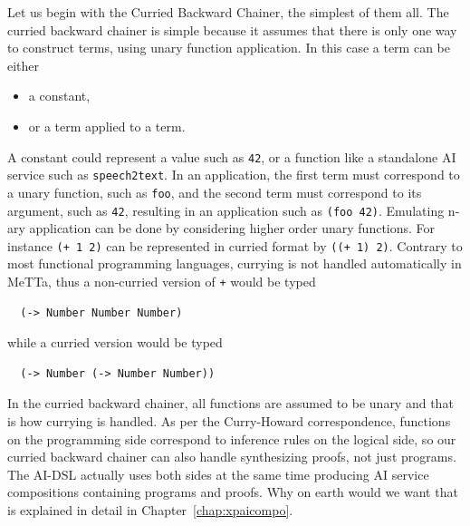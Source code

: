 \documentclass[]{report}
\begin{document}
Let us begin with the Curried Backward Chainer, the simplest of them
all.  The curried backward chainer is simple because it assumes that
there is only one way to construct terms, using unary function
application.  In this case a term can be either
\begin{itemize}
\item a constant,
\item or a term applied to a term.
\end{itemize}
A constant could represent a value such as \texttt{42}, or
a function like a standalone AI service such as
\texttt{speech2text}.  In an application, the first term
must correspond to a unary function, such as \texttt{foo},
and the second term must correspond to its argument, such as
\texttt{42}, resulting in an application such as
\texttt{(foo 42)}.  Emulating n-ary application can be
done by considering higher order unary functions.  For instance
\texttt{(+ 1 2)} can be represented in curried format by
\texttt{((+ 1) 2)}.  Contrary to most functional
programming languages, currying is not handled automatically in MeTTa,
thus a non-curried version of \texttt{+} would be typed
\begin{verbatim}
  (-> Number Number Number)
\end{verbatim}
while a curried version would be typed
\begin{verbatim}
  (-> Number (-> Number Number))
\end{verbatim}
In the curried backward chainer, all functions are assumed to be unary
and that is how currying is handled.  As per the Curry-Howard
correspondence, functions on the programming side correspond to
inference rules on the logical side, so our curried backward chainer
can also handle synthesizing proofs, not just programs.  The AI-DSL
actually uses both sides at the same time producing AI service
compositions containing programs and proofs.  Why on earth would we
want that is explained in detail in Chapter~\ref{chap:xpaicompo}.\\
\end{document}

